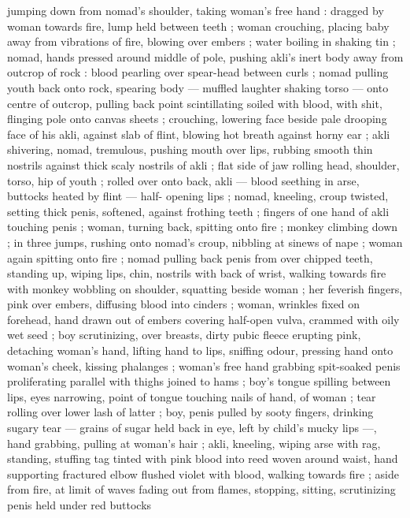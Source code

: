 jumping down from nomad's shoulder, taking woman's free hand : 
dragged by woman towards fire, lump held between teeth ; woman 
crouching, placing baby away from vibrations of fire, blowing over 
embers ; water boiling in shaking tin ; nomad, hands pressed around 
middle of pole, pushing akli's inert body away from outcrop of rock 
: blood pearling over spear-head between curls ; nomad pulling 
youth back onto rock, spearing body --- muffled laughter shaking 
torso --- onto centre of outcrop, pulling back point scintillating 
soiled with blood, with shit, flinging pole onto canvas sheets ; 
crouching, lowering face beside pale drooping face of his akli, 
against slab of flint, blowing hot breath against horny ear ; akli 
shivering, nomad, tremulous, pushing mouth over lips, rubbing 
smooth thin nostrils against thick scaly nostrils of akli ; flat side of 
jaw rolling head, shoulder, torso, hip of youth ; rolled over onto back, 
akli --- blood seething in arse, buttocks heated by flint --- half- 
opening lips ; nomad, kneeling, croup twisted, setting thick penis, 
softened, against frothing teeth ; fingers of one hand of akli 
touching penis ; woman, turning back, spitting onto fire ; monkey 
climbing down ; in three jumps, rushing onto nomad's croup, nibbling 
at sinews of nape ; woman again spitting onto fire ; nomad pulling 
back penis from over chipped teeth, standing up, wiping lips, chin, 
nostrils with back of wrist, walking towards fire with monkey wobbling 
on shoulder, squatting beside woman ; her feverish fingers, pink over 
embers, diffusing blood into cinders ; woman, wrinkles fixed on 
forehead, hand drawn out of embers covering half-open vulva, 
crammed with oily wet seed ; boy scrutinizing, over breasts, dirty 
pubic fleece erupting pink, detaching woman's hand, lifting hand to 
lips, sniffing odour, pressing hand onto woman's cheek, kissing 
phalanges ; woman's free hand grabbing spit-soaked penis 
proliferating parallel with thighs joined to hams ; boy's tongue 
spilling between lips, eyes narrowing, point of tongue touching nails 
of hand, of woman ; tear rolling over lower lash of latter ; boy, penis 
pulled by sooty fingers, drinking sugary tear --- grains of sugar held 
back in eye, left by child's mucky lips ---, hand grabbing, pulling at 
woman's hair ; akli, kneeling, wiping arse with rag, standing, stuffing 
tag tinted with pink blood into reed woven around waist, hand 
supporting fractured elbow flushed violet with blood, walking 
towards fire ; aside from fire, at limit of waves fading out from 
flames, stopping, sitting, scrutinizing penis held under red buttocks 
